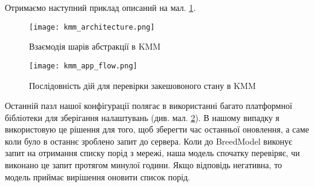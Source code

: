 Отримаємо наступний приклад описаний на мал. \ref{fig:kmm_architecture}.

\begin{figure}
    \begin{center}
        \texttt{[image: kmm\_architecture.png]}
        \caption{Взаємодія шарів абстракції в KMM}
        \label{fig:kmm_architecture}
    \end{center}
\end{figure}

\begin{figure}
    \begin{center}
        \texttt{[image: kmm\_app\_flow.png]}
        \caption{Послідовність дій для перевірки закешовоного стану в KMM}
        \label{fig:kmm_app_flow}
    \end{center}
\end{figure}

Останній пазл нашої конфігурації полягає в використанні багато платформної бібліотеки для зберігання налаштувань (див. мал. \ref{fig:kmm_app_flow}).
В нашому випадку я використовую це рішення для того, щоб зберегти час останньої оновлення, а саме коли було в останнє зроблено запит до сервера.
Коли до BreedModel виконує запит на отримання списку порід з мережі, наша модель спочатку перевіряє, чи виконано це запит протягом минулої години.
Якщо відповідь негативна, то модель приймає вирішення оновити список порід.
